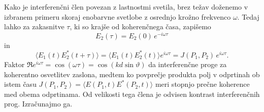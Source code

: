 Kako je interferenčni člen povezan z lastnostmi svetila, brez težav
doženemo v izbranem primeru skoraj enobarvne svetlobe z osrednjo krožno frekvenco
$\omega$. Tedaj lahko za zakasnitve $\tau$, ki so krajše
od koherenčnega časa, zapišemo 
\begin{equation}
E_{2}(\tau)=E_{2}(0)\, e^{-i\omega\tau}
\end{equation}
 in 
\begin{equation}
\langle E_{1}(t)E_{2}^{*}(t+\tau)\rangle=
\langle E_{1}(t)E_{2}^{*}(t)\rangle 
e^{i\omega\tau}=J(P_{1},P_{2})\, e^{i\omega\tau}.
\end{equation}
Faktor $\Re e^{i\omega\tau}= \cos(\omega \tau) = \cos(kd\sin\vartheta)$ da interferenčne
proge za koherentno osvetlitev zaslona, medtem ko povprečje produkta polj
v odprtinah ob istem času $J(P_{1},P_{2})=\langle E(P_{1},t)E^{*}(P_{2},t)\rangle$
meri stopnjo prečne koherence med obema odprtinama. Od velikosti
tega člena je odvisen kontrast interferenčnih prog. Izračunajmo ga.

